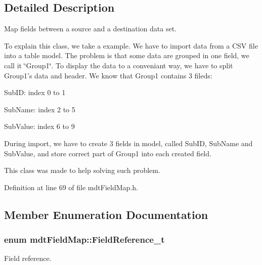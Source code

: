 \subsection{Detailed Description}
Map fields between a source and a destination data set. 

To explain this class, we take a example. We have to import data from a CSV file into a table model. The problem is that some data are grouped in one field, we call it \char`\"{}Group1\char`\"{}. To display the data to a conveniant way, we have to split Group1's data and header. We know that Group1 contains 3 fileds:
\begin{DoxyItemize}
\item SubID: index 0 to 1
\item SubName: index 2 to 5
\item SubValue: index 6 to 9
\end{DoxyItemize}

During import, we have to create 3 fields in model, called SubID, SubName and SubValue, and store correct part of Group1 into each created field.

This class was made to help solving such problem. 

Definition at line 69 of file mdtFieldMap.h.



\subsection{Member Enumeration Documentation}
\hypertarget{classmdt_field_map_a8a8dd62273d396d926bf3df837407392}{
\subsubsection[{FieldReference\_\-t}]{\setlength{\rightskip}{0pt plus 5cm}enum {\bf mdtFieldMap::FieldReference\_\-t}}}
\label{classmdt_field_map_a8a8dd62273d396d926bf3df837407392}


Field reference. 

